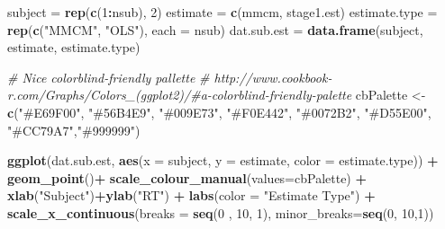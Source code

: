\documentclass[
]{book}
\newenvironment{Shaded}{\begin{snugshade}}{\end{snugshade}}
\newcommand{\CommentTok}[1]{\textcolor[rgb]{0.56,0.35,0.01}{\textit{#1}}}
\newcommand{\DataTypeTok}[1]{\textcolor[rgb]{0.13,0.29,0.53}{#1}}
\newcommand{\DecValTok}[1]{\textcolor[rgb]{0.00,0.00,0.81}{#1}}
\newcommand{\KeywordTok}[1]{\textcolor[rgb]{0.13,0.29,0.53}{\textbf{#1}}}
\newcommand{\NormalTok}[1]{#1}
\newcommand{\OperatorTok}[1]{\textcolor[rgb]{0.81,0.36,0.00}{\textbf{#1}}}
\newcommand{\StringTok}[1]{\textcolor[rgb]{0.31,0.60,0.02}{#1}}
\begin{document}
\begin{Shaded}
\begin{Highlighting}[]
\NormalTok{subject =}\StringTok{ }\KeywordTok{rep}\NormalTok{(}\KeywordTok{c}\NormalTok{(}\DecValTok{1}\OperatorTok{:}\NormalTok{nsub), }\DecValTok{2}\NormalTok{)}
\NormalTok{estimate =}\StringTok{ }\KeywordTok{c}\NormalTok{(mmcm, stage1.est)}
\NormalTok{estimate.type =}\StringTok{ }\KeywordTok{rep}\NormalTok{(}\KeywordTok{c}\NormalTok{(}\StringTok{"MMCM"}\NormalTok{, }\StringTok{"OLS"}\NormalTok{), }\DataTypeTok{each =}\NormalTok{ nsub)}
\NormalTok{dat.sub.est =}\StringTok{ }\KeywordTok{data.frame}\NormalTok{(subject, estimate, estimate.type)}

\CommentTok{\# Nice colorblind{-}friendly pallette}
\CommentTok{\# http://www.cookbook{-}r.com/Graphs/Colors\_(ggplot2)/\#a{-}colorblind{-}friendly{-}palette}
\NormalTok{cbPalette <{-}}\StringTok{ }\KeywordTok{c}\NormalTok{(}\StringTok{"\#E69F00"}\NormalTok{, }\StringTok{"\#56B4E9"}\NormalTok{, }\StringTok{"\#009E73"}\NormalTok{, }\StringTok{"\#F0E442"}\NormalTok{, }\StringTok{"\#0072B2"}\NormalTok{, }\StringTok{"\#D55E00"}\NormalTok{, }\StringTok{"\#CC79A7"}\NormalTok{,}\StringTok{"\#999999"}\NormalTok{)}


\KeywordTok{ggplot}\NormalTok{(dat.sub.est, }\KeywordTok{aes}\NormalTok{(}\DataTypeTok{x =}\NormalTok{ subject, }\DataTypeTok{y =}\NormalTok{ estimate, }
                        \DataTypeTok{color =}\NormalTok{ estimate.type)) }\OperatorTok{+}
\StringTok{  }\KeywordTok{geom\_point}\NormalTok{()}\OperatorTok{+}\StringTok{ }\KeywordTok{scale\_colour\_manual}\NormalTok{(}\DataTypeTok{values=}\NormalTok{cbPalette) }\OperatorTok{+}\StringTok{ }\KeywordTok{xlab}\NormalTok{(}\StringTok{"Subject"}\NormalTok{)}\OperatorTok{+}\KeywordTok{ylab}\NormalTok{(}\StringTok{"RT"}\NormalTok{) }\OperatorTok{+}\StringTok{ }\KeywordTok{labs}\NormalTok{(}\DataTypeTok{color =} \StringTok{"Estimate Type"}\NormalTok{) }\OperatorTok{+}\StringTok{ }
\StringTok{  }\KeywordTok{scale\_x\_continuous}\NormalTok{(}\DataTypeTok{breaks =} \KeywordTok{seq}\NormalTok{(}\DecValTok{0}\NormalTok{ , }\DecValTok{10}\NormalTok{, }\DecValTok{1}\NormalTok{), }\DataTypeTok{minor\_breaks=}\KeywordTok{seq}\NormalTok{(}\DecValTok{0}\NormalTok{, }\DecValTok{10}\NormalTok{,}\DecValTok{1}\NormalTok{))}
\end{Highlighting}
\end{Shaded}
\end{document}
